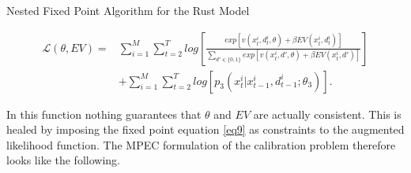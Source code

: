 \vspace{2ex}
\begin{algorithm}[!h]
	\caption{Nested Fixed Point Algorithm for the Rust Model}
	\label{alg3}
	\SetAlgoLined
\end{algorithm}
\vspace{2ex}

\begin{equation}
\begin{split}
\mathcal{L}(\theta, EV) = &\sum_{i=1}^{M} \sum_{t=2}^{T} log \left[\frac{exp[v(x^i_t, d^i_t, \theta) + \beta EV(x^i_t, d^i_t)]}{\sum_{d' \in \{0, 1\}}exp[v(x^i_t, d', \theta) + \beta EV(x^i_t, d')]}\right] \\[+3mm]
&+ \sum_{i=1}^{M} \sum_{t=2}^{T} log[p_3(x^i_t|x^i_{t-1}, d^i_{t-1}; \theta_3)].
\end{split}
\end{equation}

In this function nothing guarantees that $\theta$ and $EV$ are actually consistent. This is healed by imposing the fixed point equation \ref{eq9} as constraints to the augmented likelihood function. The MPEC formulation of the calibration problem therefore looks like the following.

